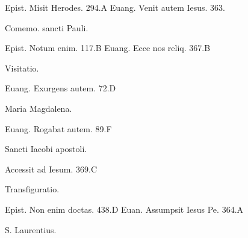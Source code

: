\documentclass[a5paper,10pt]{book}
\begin{document}
\begin{multicols}{2}
\begin{center}
\end{center}
\vspace{-.75em}
\par \noindent Epist. Misit Herodes. \hfill 294.A
\newline Euang. Venit autem Iesus. \hfill 363.%
\newline \vspace{-1.75em}
\begin{center}
\color{red} Comemo. sancti Pauli.
\end{center}
\vspace{-.75em}
\par \noindent Epist. Notum enim. \hfill 117.B
\newline Euang. Ecce nos reliq. \hfill 367.B
\newline \vspace{-1.75em}
\begin{center}
\color{red} Visitatio.
\end{center}
\vspace{-.75em}
\par \noindent Euang. Exurgens autem. \hfill 72.D
\newline \vspace{-1.75em}
\begin{center}
\color{red} Maria Magdalena.
\end{center}
\vspace{-.75em}
\par \noindent Euang. Rogabat autem. \hfill 89.F
\newline \vspace{-1.75em}
\begin{center}
\color{red} Sancti Iacobi apostoli.
\end{center}
\vspace{-.75em}
\par \noindent Accessit ad Iesum. \hfill 369.C
\newline \vspace{-1.75em}
\begin{center}
\color{red} Transfiguratio.
\end{center}
\vspace{-.75em}
\par \noindent Epist. Non enim doctas. \hfill 438.D
\newline Euan. Assumpsit Iesus Pe. \hfill 364.A
\newline \vspace{-1.75em}
\begin{center}
\color{red} S. Laurentius.
\end{center}

\end{multicols}
\end{document}
